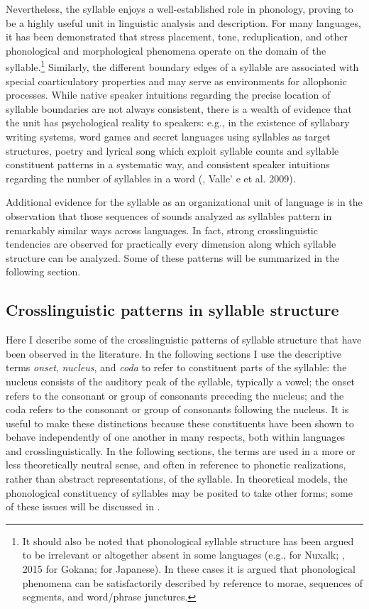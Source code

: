   Nevertheless, the syllable enjoys a well-established role in phonology, proving to be a highly useful unit in linguistic analysis and description. For many languages, it has been demonstrated that stress placement, tone, reduplication, and other phonological and morphological phenomena operate on the domain of the syllable.\footnote{{It should also be noted that phonological syllable structure has been argued to be irrelevant or altogether absent in some languages (e.g., \citealt{Newman1947} for Nuxalk; \citealt{Hyman2011}, 2015 for Gokana; \citealt{Labrune2012} for Japanese). In these cases it is argued that phonological phenomena can be satisfactorily described by reference to morae, sequences of segments, and word/phrase junctures.}} Similarly, the different boundary edges of a syllable are associated with special coarticulatory properties and may serve as environments for allophonic processes. While native speaker intuitions regarding the precise location of syllable boundaries are not always consistent, there is a wealth of evidence that the unit has psychological reality to speakers: e.g., in the existence of syllabary writing systems, word games and secret languages using syllables as target structures, poetry and lyrical song which exploit syllable counts and syllable constituent patterns in a systematic way, and consistent speaker intuitions regarding the number of syllables in a word (\citealt{BellHooper1978,Blevins1995}, Valle\'{} e et al. 2009).

  Additional evidence for the syllable as an organizational unit of language is in the observation that those sequences of sounds analyzed as syllables pattern in remarkably similar ways across languages. In fact, strong crosslinguistic tendencies are observed for practically every dimension along which syllable structure can be analyzed. Some of these patterns will be summarized in the following section.

\subsection{Crosslinguistic patterns in syllable structure}\label{sec:1.1.2}

  Here I describe some of the crosslinguistic patterns of syllable structure that have been observed in the literature. In the following sections I use the descriptive terms \textit{onset}, \textit{nucleus}, and \textit{coda} to refer to constituent parts of the syllable: the nucleus consists of the auditory peak of the syllable, typically a vowel; the onset refers to the consonant or group of consonants preceding the nucleus; and the coda refers to the consonant or group of consonants following the nucleus. It is useful to make these distinctions because these constituents have been shown to behave independently of one another in many respects, both within languages and crosslinguistically. In the following sections, the terms are used in a more or less theoretically neutral sense, and often in reference to phonetic realizations, rather than abstract representations, of the syllable. In theoretical models, the phonological constituency of syllables may be posited to take other forms; some of these issues will be discussed in .

